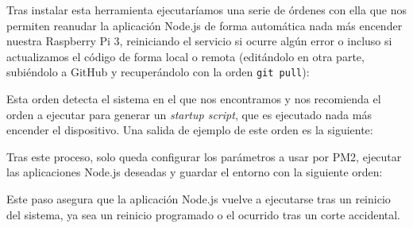 \begin{appendices}
Tras instalar esta herramienta ejecutaríamos una serie de órdenes con ella que nos permiten reanudar la aplicación Node.js de forma automática nada más encender nuestra Raspberry Pi 3, reiniciando el servicio si ocurre algún error o incluso si actualizamos el código de forma local o remota (editándolo en otra parte, subiéndolo a GitHub y recuperándolo con la orden \texttt{git pull}): 


Esta orden detecta el sistema en el que nos encontramos y nos recomienda el orden a ejecutar para generar un \emph{startup script}, que es ejecutado nada más encender el dispositivo. Una salida de ejemplo de este orden es la siguiente:


Tras este proceso, solo queda configurar los parámetros a usar por PM2, ejecutar las aplicaciones Node.js deseadas y guardar el entorno con la siguiente orden:


Este paso asegura que la aplicación Node.js vuelve a ejecutarse tras un reinicio del sistema, ya sea un reinicio programado o el ocurrido tras un corte accidental.


\end{appendices}
